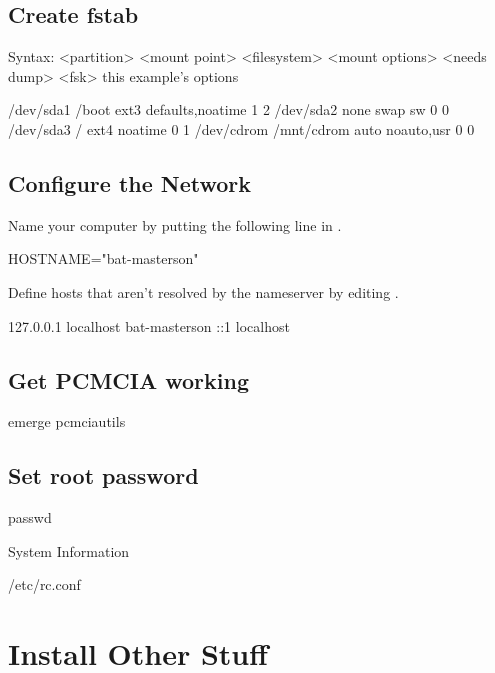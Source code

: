 \subsection{Create fstab}
Syntax:
  <partition> <mount point> <filesystem> <mount options> <needs dump> <fsk>
this example's options
\begin{code}
/dev/sda1    /boot       ext3 defaults,noatime 1 2
/dev/sda2    none        swap sw 0 0
/dev/sda3    /           ext4 noatime 0 1
/dev/cdrom   /mnt/cdrom  auto noauto,usr 0 0
\end{code}

\subsection{Configure the Network}
Name your computer by putting the following line in .
\begin{code}
HOSTNAME="bat-masterson"
\end{code}

%
%

Define hosts that aren't resolved by the nameserver by editing .
\begin{code}
127.0.0.1       localhost       bat-masterson
::1             localhost
\end{code}

\subsection{Get PCMCIA working}
\begin{code}
emerge pcmciautils
\end{code}

\subsection{Set root password}
\begin{code}
passwd
\end{code}

System Information
\begin{code}
/etc/rc.conf
\end{code}


\section{Install Other Stuff}

